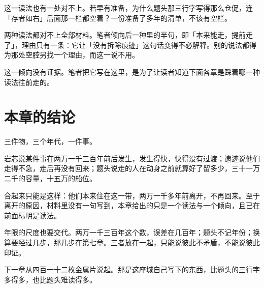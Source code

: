 这一读法也有一处对不上。若早有准备，为什么题头那三行字写得那么仓促，连「存者如右」后面那一栏都空着？一份准备了多年的清单，不该有空栏。

两种读法都对不上全部材料。笔者倾向后一种里的半句，即「本来能走，提前走了」，理由只有一条：它让「没有拆除痕迹」这句话变得不必解释。别的说法都得为那处空腔另找一个理由，而这一说不用。

这一倾向没有证据。笔者把它写在这里，是为了让读者知道下面各章是踩着哪一种读法往前走的。

\section{本章的结论}

三件物，三个年代，一件事。

岩芯说某件事在两万一千三百年前后发生，发生得快，快得没有过渡；遗迹说他们走得不急，走后再没有回来；题头说走的人在动身之前就算好了留多少，三十一万二千的容量，十五万的船位。

合起来只能是这样：他们本来住在这一带，两万一千多年前离开，不再回来。至于离开的原因，材料里没有一句写到，本章给出的只是一个读法与一个倾向，且已在前面标明是读法。

年限的尺度也要交代。两万一千三百年这个数，误差在几百年；题头不记年份；换算要经过几步，那几步在第七章。三者放在一起，只能说彼此不矛盾，不能说彼此印证。

下一章从四百一十二枚金属片说起。那是这座城自己写下的东西，比题头的三行字多得多，也比题头难读得多。
